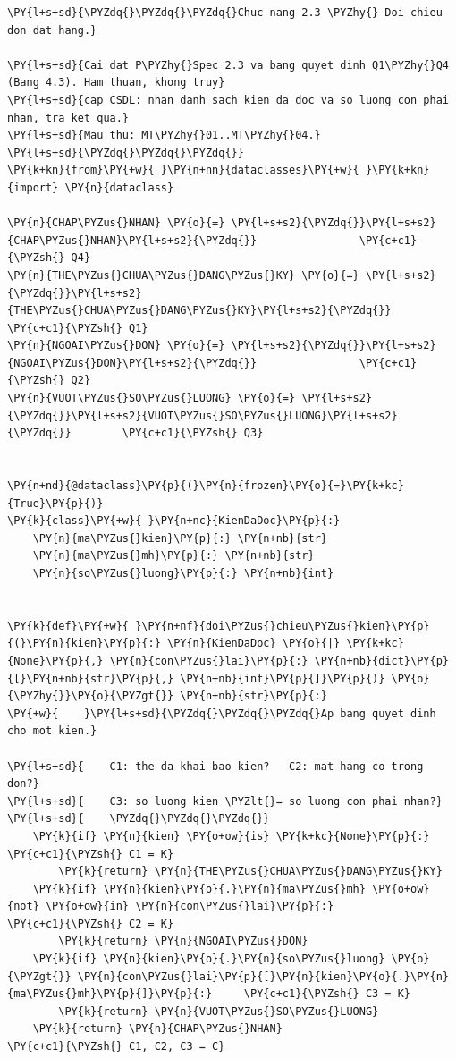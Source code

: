 \begin{Verbatim}[commandchars=\\\{\},frame=single,framerule=0.3pt,rulecolor=\color{black!40},fontsize=\footnotesize,breaklines=true]
\PY{l+s+sd}{\PYZdq{}\PYZdq{}\PYZdq{}Chuc nang 2.3 \PYZhy{} Doi chieu don dat hang.}

\PY{l+s+sd}{Cai dat P\PYZhy{}Spec 2.3 va bang quyet dinh Q1\PYZhy{}Q4 (Bang 4.3). Ham thuan, khong truy}
\PY{l+s+sd}{cap CSDL: nhan danh sach kien da doc va so luong con phai nhan, tra ket qua.}
\PY{l+s+sd}{Mau thu: MT\PYZhy{}01..MT\PYZhy{}04.}
\PY{l+s+sd}{\PYZdq{}\PYZdq{}\PYZdq{}}
\PY{k+kn}{from}\PY{+w}{ }\PY{n+nn}{dataclasses}\PY{+w}{ }\PY{k+kn}{import} \PY{n}{dataclass}

\PY{n}{CHAP\PYZus{}NHAN} \PY{o}{=} \PY{l+s+s2}{\PYZdq{}}\PY{l+s+s2}{CHAP\PYZus{}NHAN}\PY{l+s+s2}{\PYZdq{}}                \PY{c+c1}{\PYZsh{} Q4}
\PY{n}{THE\PYZus{}CHUA\PYZus{}DANG\PYZus{}KY} \PY{o}{=} \PY{l+s+s2}{\PYZdq{}}\PY{l+s+s2}{THE\PYZus{}CHUA\PYZus{}DANG\PYZus{}KY}\PY{l+s+s2}{\PYZdq{}}  \PY{c+c1}{\PYZsh{} Q1}
\PY{n}{NGOAI\PYZus{}DON} \PY{o}{=} \PY{l+s+s2}{\PYZdq{}}\PY{l+s+s2}{NGOAI\PYZus{}DON}\PY{l+s+s2}{\PYZdq{}}                \PY{c+c1}{\PYZsh{} Q2}
\PY{n}{VUOT\PYZus{}SO\PYZus{}LUONG} \PY{o}{=} \PY{l+s+s2}{\PYZdq{}}\PY{l+s+s2}{VUOT\PYZus{}SO\PYZus{}LUONG}\PY{l+s+s2}{\PYZdq{}}        \PY{c+c1}{\PYZsh{} Q3}


\PY{n+nd}{@dataclass}\PY{p}{(}\PY{n}{frozen}\PY{o}{=}\PY{k+kc}{True}\PY{p}{)}
\PY{k}{class}\PY{+w}{ }\PY{n+nc}{KienDaDoc}\PY{p}{:}
    \PY{n}{ma\PYZus{}kien}\PY{p}{:} \PY{n+nb}{str}
    \PY{n}{ma\PYZus{}mh}\PY{p}{:} \PY{n+nb}{str}
    \PY{n}{so\PYZus{}luong}\PY{p}{:} \PY{n+nb}{int}


\PY{k}{def}\PY{+w}{ }\PY{n+nf}{doi\PYZus{}chieu\PYZus{}kien}\PY{p}{(}\PY{n}{kien}\PY{p}{:} \PY{n}{KienDaDoc} \PY{o}{|} \PY{k+kc}{None}\PY{p}{,} \PY{n}{con\PYZus{}lai}\PY{p}{:} \PY{n+nb}{dict}\PY{p}{[}\PY{n+nb}{str}\PY{p}{,} \PY{n+nb}{int}\PY{p}{]}\PY{p}{)} \PY{o}{\PYZhy{}}\PY{o}{\PYZgt{}} \PY{n+nb}{str}\PY{p}{:}
\PY{+w}{    }\PY{l+s+sd}{\PYZdq{}\PYZdq{}\PYZdq{}Ap bang quyet dinh cho mot kien.}

\PY{l+s+sd}{    C1: the da khai bao kien?   C2: mat hang co trong don?}
\PY{l+s+sd}{    C3: so luong kien \PYZlt{}= so luong con phai nhan?}
\PY{l+s+sd}{    \PYZdq{}\PYZdq{}\PYZdq{}}
    \PY{k}{if} \PY{n}{kien} \PY{o+ow}{is} \PY{k+kc}{None}\PY{p}{:}                            \PY{c+c1}{\PYZsh{} C1 = K}
        \PY{k}{return} \PY{n}{THE\PYZus{}CHUA\PYZus{}DANG\PYZus{}KY}
    \PY{k}{if} \PY{n}{kien}\PY{o}{.}\PY{n}{ma\PYZus{}mh} \PY{o+ow}{not} \PY{o+ow}{in} \PY{n}{con\PYZus{}lai}\PY{p}{:}               \PY{c+c1}{\PYZsh{} C2 = K}
        \PY{k}{return} \PY{n}{NGOAI\PYZus{}DON}
    \PY{k}{if} \PY{n}{kien}\PY{o}{.}\PY{n}{so\PYZus{}luong} \PY{o}{\PYZgt{}} \PY{n}{con\PYZus{}lai}\PY{p}{[}\PY{n}{kien}\PY{o}{.}\PY{n}{ma\PYZus{}mh}\PY{p}{]}\PY{p}{:}     \PY{c+c1}{\PYZsh{} C3 = K}
        \PY{k}{return} \PY{n}{VUOT\PYZus{}SO\PYZus{}LUONG}
    \PY{k}{return} \PY{n}{CHAP\PYZus{}NHAN}                            \PY{c+c1}{\PYZsh{} C1, C2, C3 = C}



\end{Verbatim}
